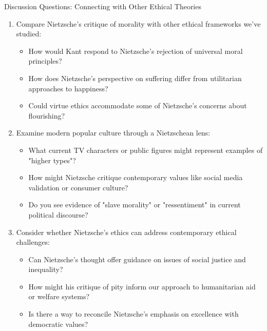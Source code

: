 \documentclass{beamer}
\begin{document}
        \begin{frame}{Discussion Questions: Connecting with Other Ethical Theories}
            \scriptsize
        \begin{enumerate}
        \item Compare Nietzsche's critique of morality with other ethical frameworks we've studied:
            \begin{itemize}
                \scriptsize
            \item How would Kant respond to Nietzsche's rejection of universal moral principles?
            \item How does Nietzsche's perspective on suffering differ from utilitarian approaches to happiness?
            \item Could virtue ethics accommodate some of Nietzsche's concerns about flourishing?
            \end{itemize}
        
        \item Examine modern popular culture through a Nietzschean lens:
            \begin{itemize}
                \scriptsize
            \item What current TV characters or public figures might represent examples of "higher types"?
            \item How might Nietzsche critique contemporary values like social media validation or consumer culture?
            \item Do you see evidence of "slave morality" or "ressentiment" in current political discourse?
            \end{itemize}
        
        \item Consider whether Nietzsche's ethics can address contemporary ethical challenges:
            \begin{itemize}
                \scriptsize
            \item Can Nietzsche's thought offer guidance on issues of social justice and inequality?
            \item How might his critique of pity inform our approach to humanitarian aid or welfare systems?
            \item Is there a way to reconcile Nietzsche's emphasis on excellence with democratic values?
            \end{itemize}
        \end{enumerate}
        \end{frame}
\end{document}
